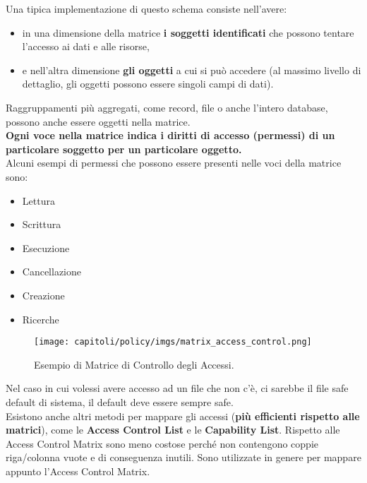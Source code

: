 Una tipica implementazione di questo schema consiste nell'avere:
\begin{itemize}
      \item in una dimensione della matrice \textbf{i soggetti identificati} che
            possono tentare l'accesso ai dati e alle risorse,
      \item e nell'altra dimensione \textbf{gli oggetti} a cui si può accedere
            (al massimo livello di dettaglio, gli oggetti possono essere singoli campi
            di dati).
\end{itemize}
Raggruppamenti più aggregati, come record, file o anche l'intero
database, possono anche essere oggetti nella matrice.\\
\textbf{Ogni voce nella matrice indica i diritti di accesso (permessi) di un
      particolare soggetto per un particolare oggetto.}\\
Alcuni esempi di permessi che possono essere presenti nelle voci della matrice
sono:
\begin{itemize}
      \item Lettura
      \item Scrittura
      \item Esecuzione
      \item Cancellazione
      \item Creazione
      \item Ricerche
\end{itemize}

\begin{figure}[H]
      \centering
      \texttt{[image: capitoli/policy/imgs/matrix\_access\_control.png]}
      \caption{Esempio di Matrice di Controllo degli Accessi.}
\end{figure}

\noindent Nel caso in cui volessi avere accesso ad un file che non c’è, ci
sarebbe il file safe default di sistema, il default deve essere sempre safe. \\
Esistono anche altri metodi per mappare gli accessi (\textbf{più efficienti
      rispetto alle matrici}), come le \textbf{Access Control List} e le \textbf{Capability
      List}. Rispetto alle Access Control Matrix sono meno costose perché non
contengono coppie riga/colonna vuote e di conseguenza inutili. Sono utilizzate
in genere per mappare appunto l’Access Control Matrix.

